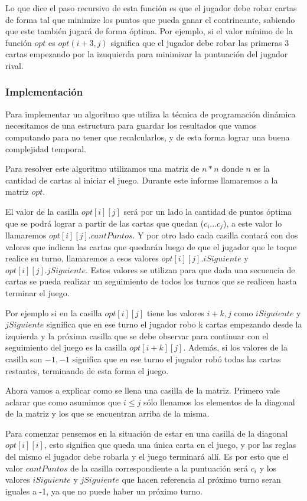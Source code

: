 Lo que dice el paso recursivo de esta función es que el jugador debe robar cartas de forma tal que minimize los puntos que pueda ganar el contrincante, sabiendo que este también jugará de forma óptima. Por ejemplo, si el valor mínimo de la función $opt$ es $opt(i+3,j)$ significa que el jugador debe robar las primeras 3 cartas empezando por la izuquierda para minimizar la puntuación del jugador rival.

\subsubsection{Implementación}

Para implementar un algoritmo que utiliza la técnica de programación dinámica necesitamos de una estructura para guardar los resultados que vamos computando para no tener que recalcularlos, y de esta forma lograr una buena complejidad temporal.

Para resolver este algoritmo utilizamos una matriz de $n * n$ donde $n$ es la cantidad de cartas al iniciar el juego. Durante este informe llamaremos a la matriz $opt$.

El valor de la casilla $opt[i][j]$ será por un lado la cantidad de puntos óptima que se podrá lograr a partir de las cartas que quedan ($c_i ... c_j$), a este valor lo llamaremos $opt[i][j].cantPuntos$. Y por otro lado cada casilla contará con dos valores que indican las cartas que quedarán luego de que el jugador que le toque realice su turno, llamaremos a esos valores $opt[i][j].iSiguiente$ y $opt[i][j].jSiguiente$. Estos valores se utilizan para que dada una secuencia de cartas se pueda realizar un seguimiento de todos los turnos que se realicen hasta terminar el juego.

Por ejemplo si en la casilla $opt[i][j]$ tiene los valores $i+k, j$ como $iSiguiente$ y $jSiguiente$ significa que en ese turno el jugador robo k cartas empezando desde la izquierda y la próxima casilla que se debe observar para continuar con el seguimiento del juego es la casilla $opt[i+k][j]$. Además, si los valores de la casilla son $-1, -1$ significa que en ese turno el jugador robó todas las cartas restantes, terminando de esta forma el juego.

Ahora vamos a explicar como se llena una casilla de la matriz. Primero vale aclarar que como asumimos que $i \leq j$ sólo llenamos los elementos de la diagonal de la matriz y los que se encuentran arriba de la misma.

Para comenzar pensemos en la situación de estar en una casilla de la diagonal $opt[i][i]$, esto significa que queda una única carta en el juego, y por las reglas del mismo el jugador debe robarla y el juego terminará allí. Es por esto que el valor $cantPuntos$ de la casilla correspondiente a la puntuación será $c_i$ y los valores $iSiguiente$ y $jSiguiente$ que hacen referencia al próximo turno seran iguales a -1, ya que no puede haber un próximo turno.

